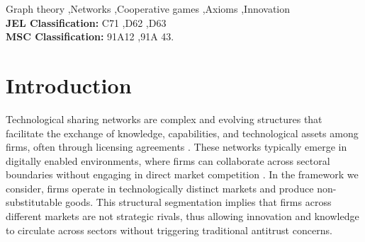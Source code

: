 \documentclass[preprint,11pt,authoryear]{elsarticle}
\theoremstyle{plain}
\begin{document}
\begin{frontmatter}


\begin{keyword}
Graph theory \sep Networks \sep Cooperative games \sep Axioms \sep Innovation \\
{\bf JEL Classification:} C71 \sep D62 \sep D63 \\
{\bf MSC Classification:} 91A12 \sep 91A 43.
\end{keyword}

\end{frontmatter}



\section{Introduction}

Technological sharing networks are complex and evolving structures that facilitate the exchange of knowledge, capabilities, and technological assets among firms, often through licensing agreements \citep{Shapiro1985patent, fagerberg2005oxford}. These networks typically emerge in digitally enabled environments, where firms can collaborate across sectoral boundaries without engaging in direct market competition \citep{arora2006patent}. In the framework we consider, firms operate in technologically distinct markets and produce non-substitutable goods. This structural segmentation implies that firms across different markets are not strategic rivals, thus allowing innovation and knowledge to circulate across sectors without triggering traditional antitrust concerns.
\end{document}
